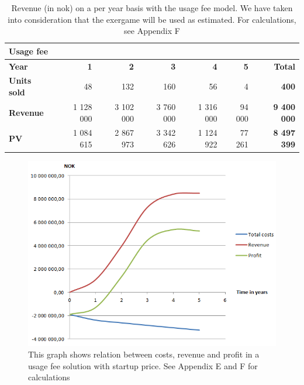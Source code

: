 \begin{table}
 \caption[Revenue with use of Usage Fee Model]{Revenue (in \ac{nok}) on a per year basis with the usage fee model. We have taken into consideration that the exergame will be used as estimated. For calculations, see Appendix F}
\begin{tabular}{|l|r|r|r|r|r|r|}
        \hline
       \textbf{Usage fee}  & & & & & & \\ \hline
      \textbf{Year} & \textbf{1} & \textbf{2} & \textbf{3} & \textbf{4} & \textbf{5} & \textbf{Total}\\ \hline
	   \textbf{Units sold} & 48 & 132 & 160 & 56 & 4 & \textbf{400}\\ \hline
	   \textbf{Revenue} & 1 128 000 & 3 102 000 & 3 760 000 & 1 316 000 & 94 000 & \textbf{9 400 000} \\ \hline  
	   \textbf{PV} & 1 084 615 & 2 867 973 & 3 342 626 & 1 124 922 & 77 261 & \textbf{8 497 399}  \\ \hline
    \end{tabular}
    \label{tab:revusage}
\end{table}
\begin{figure}
\begin{center}
\includegraphics[scale=0.8]{profitusagefee}
\caption[Profit, Revenue and Cost for a Usage Fee Solution]{This graph shows relation between costs, revenue and profit in a usage fee solution with startup price. See Appendix E and F for calculations}
\label{fig:ProfitUsageFee}
\end{center}
\end{figure}

